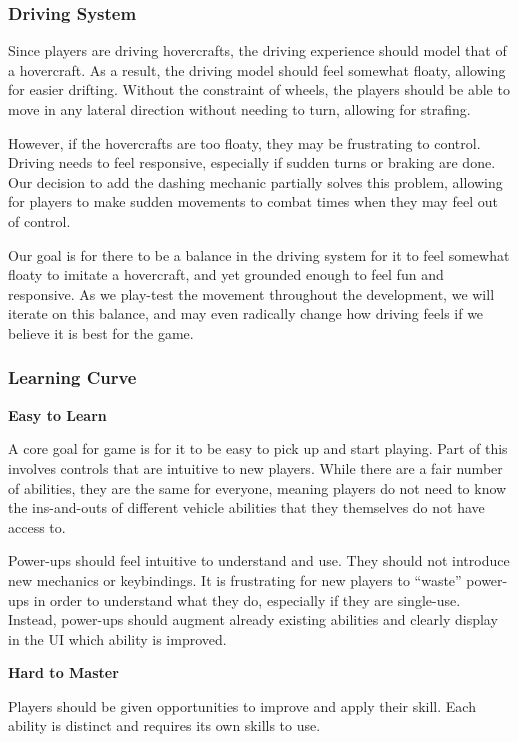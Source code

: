 \documentclass{article}
\theoremstyle{definition}
\begin{document}
\subsubsection{Driving System}

Since players are driving hovercrafts, the driving experience should model
that of a hovercraft. As a result, the driving model should feel somewhat
floaty, allowing for easier drifting. Without the constraint of wheels, the
players should be able to move in any lateral direction without needing to
turn, allowing for strafing.

However, if the hovercrafts are too floaty, they may be frustrating to control.
Driving needs to feel responsive, especially if sudden turns or braking are
done. Our decision to add the dashing mechanic partially solves this problem,
allowing for players to make sudden movements to combat times when they may
feel out of control.

Our goal is for there to be a balance in the driving system for it to feel
somewhat floaty to imitate a hovercraft, and yet grounded enough to feel fun
and responsive. As we play-test the movement throughout the development, we
will iterate on this balance, and may even radically change how driving feels
if we believe it is best for the game.


\subsubsection{Learning Curve}

\textbf{Easy to Learn}

A core goal for game is for it to be easy to pick up and start playing.
Part of this involves controls that are intuitive to new players. While there
are a fair number of abilities, they are the same for everyone, meaning players
do not need to know the ins-and-outs of different vehicle abilities that they
themselves do not have access to.

Power-ups should feel intuitive to understand and use. They should not
introduce new mechanics or keybindings. It is frustrating for new players to
``waste'' power-ups in order to understand what they do, especially if they are
single-use. Instead, power-ups should augment already existing abilities and
clearly display in the UI which ability is improved.

\textbf{Hard to Master}

Players should be given opportunities to improve and apply their skill. Each
ability is distinct and requires its own skills to use.
\end{document}
